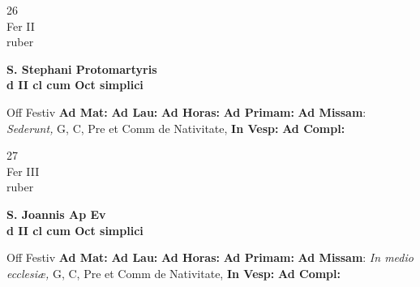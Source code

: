 \documentclass[10pt, openany]{book}
\begin{document}
    \begin{center}
        \begin{minipage}{3.5in}
            \vspace{2em}
            \begin{minipage}{0.5in}
                {\Huge 26} \\
                {\normalsize Fer II} \\
                {\normalsize ruber}
            \end{minipage}
            \begin{minipage}{3.0in}
                \textbf{ \large S. Stephani Protomartyris \\
                \textnormal{\normalsize d II cl cum Oct simplici}} \\ 
            \end{minipage}
            \begin{justify}Off Festiv
                \textbf{Ad Mat: }
                \textbf{Ad Lau: }
                \textbf{Ad Horas: }
                \textbf{Ad Primam: }\textbf{Ad Missam}: \textit{Sederunt,} G, C, Pre et Comm de Nativitate,  
                \textbf{In Vesp: }
                \textbf{Ad Compl: }
            \end{justify}
        \end{minipage}
    \end{center}

    \begin{center}
        \begin{minipage}{3.5in}
            \vspace{2em}
            \begin{minipage}{0.5in}
                {\Huge 27} \\
                {\normalsize Fer III} \\
                {\normalsize ruber}
            \end{minipage}
            \begin{minipage}{3.0in}
                \textbf{ \large S. Joannis Ap Ev \\
                \textnormal{\normalsize d II cl cum Oct simplici}} \\ 
            \end{minipage}
            \begin{justify}Off Festiv
                \textbf{Ad Mat: }
                \textbf{Ad Lau: }
                \textbf{Ad Horas: }
                \textbf{Ad Primam: }\textbf{Ad Missam}: \textit{In medio ecclesiæ,} G, C, Pre et Comm de Nativitate,  
                \textbf{In Vesp: }
                \textbf{Ad Compl: }
            \end{justify}
        \end{minipage}
    \end{center}
\end{document}
